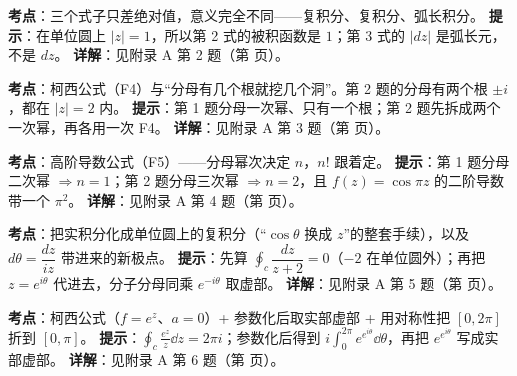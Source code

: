\documentclass[11pt]{ctexart}
\let\origsubhdr\subhdr
\renewcommand{\subhdr}[1]{\par\needspace{4\baselineskip}\origsubhdr{#1}}
\renewcommand{\qbreak}{\needspace{0.45\textheight}}
\begin{document}
\qbreak
{}
\label{hw:2}
\textbf{考点}：三个式子只差绝对值，意义完全不同——复积分、复积分、弧长积分。
\textbf{提示}：在单位圆上 $|z|=1$，所以第 2 式的被积函数是 $1$；第 3 式的 $|dz|$ 是弧长元，不是 $dz$。
\textbf{详解}：见附录 A 第 2 题（第 \pageref{app:hw2} 页）。

\qbreak
{}
\label{hw:3}
\textbf{考点}：柯西公式（F4）与“分母有几个根就挖几个洞”。第 2 题的分母有两个根 $\pm i$，都在 $|z|=2$ 内。
\textbf{提示}：第 1 题分母一次幂、只有一个根；第 2 题先拆成两个一次幂，再各用一次 F4。
\textbf{详解}：见附录 A 第 3 题（第 \pageref{app:hw3} 页）。

\qbreak
{}
\label{hw:4}
\textbf{考点}：高阶导数公式（F5）——分母幂次决定 $n$，$n!$ 跟着定。
\textbf{提示}：第 1 题分母二次幂 $\Rightarrow n=1$；第 2 题分母三次幂 $\Rightarrow n=2$，且 $f(z)=\cos\pi z$ 的二阶导数带一个 $\pi^{2}$。
\textbf{详解}：见附录 A 第 4 题（第 \pageref{app:hw4} 页）。

\qbreak
{}
\label{hw:5}
\textbf{考点}：把实积分化成单位圆上的复积分（“$\cos\theta$ 换成 $z$”的整套手续），以及 $d\theta=\dfrac{dz}{iz}$ 带进来的新极点。
\textbf{提示}：先算 $\oint_c\dfrac{dz}{z+2}=0$（$-2$ 在单位圆外）；再把 $z=e^{i\theta}$ 代进去，分子分母同乘 $e^{-i\theta}$ 取虚部。
\textbf{详解}：见附录 A 第 5 题（第 \pageref{app:hw5} 页）。

\qbreak
{}
\label{hw:6}
\textbf{考点}：柯西公式（$f=e^{z}$、$a=0$）+ 参数化后取实部虚部 + 用对称性把 $[0,2\pi]$ 折到 $[0,\pi]$。
\textbf{提示}：$\oint_c\frac{e^{z}}{z}\dd z=2\pi i$；参数化后得到 $i\displaystyle\int_0^{2\pi}e^{e^{i\theta}}\dd\theta$，再把 $e^{e^{i\theta}}$ 写成实部虚部。
\textbf{详解}：见附录 A 第 6 题（第 \pageref{app:hw6} 页）。
\end{document}
